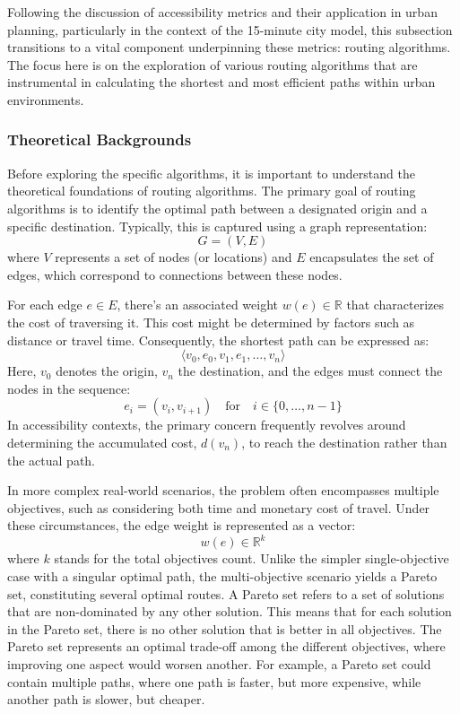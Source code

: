 Following the discussion of accessibility metrics and their application in urban planning, particularly in the context of the 15-minute city model, this subsection transitions to a vital component underpinning these metrics: routing algorithms.
The focus here is on the exploration of various routing algorithms that are instrumental in calculating the shortest and most efficient paths within urban environments. 

\subsubsection{Theoretical Backgrounds}

Before exploring the specific algorithms, it is important to understand the theoretical foundations of routing algorithms.
The primary goal of routing algorithms is to identify the optimal path between a designated origin and a specific destination.
Typically, this is captured using a graph representation:
\[ G = (V, E) \]
where $V$ represents a set of nodes (or locations) and $E$ encapsulates the set of edges, which correspond to connections between these nodes.

For each edge \( e \in E \), there's an associated weight \( w(e) \in \mathbb{R} \) that characterizes the cost of traversing it.
This cost might be determined by factors such as distance or travel time.
Consequently, the shortest path can be expressed as:
\[ \langle v_0, e_0, v_1, e_1, \dots, v_n \rangle \]
Here, \( v_0 \) denotes the origin, \( v_n \) the destination, and the edges must connect the nodes in the sequence:
\[ e_i = (v_i, v_{i+1}) \quad \text{for} \quad i \in \{0, \dots, n-1\} \]
In accessibility contexts, the primary concern frequently revolves around determining the accumulated cost, \( d(v_n) \), to reach the destination rather than the actual path.

In more complex real-world scenarios, the problem often encompasses multiple objectives, such as considering both time and monetary cost of travel.
Under these circumstances, the edge weight is represented as a vector:
\[ w(e) \in \mathbb{R}^k \]
where \( k \) stands for the total objectives count.
Unlike the simpler single-objective case with a singular optimal path, the multi-objective scenario yields a Pareto set, constituting several optimal routes.
A Pareto set refers to a set of solutions that are non-dominated by any other solution.
This means that for each solution in the Pareto set, there is no other solution that is better in all objectives.
The Pareto set represents an optimal trade-off among the different objectives, where improving one aspect would worsen another.
For example, a Pareto set could contain multiple paths, where one path is faster, but more expensive, while another path is slower, but cheaper.

